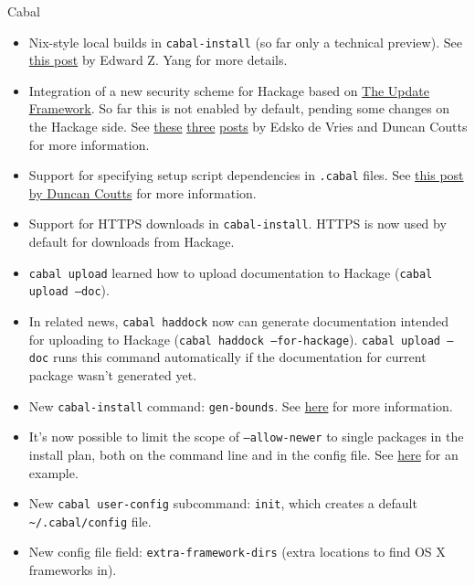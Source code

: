 \documentclass[DIV16,twocolumn,10pt]{scrreprt}
\begin{document}
\begin{hcarentry}{Cabal}
\begin{itemize}
\item Nix-style local builds in \texttt{cabal-install} (so far only a technical
  preview). See
  \href{http://blog.ezyang.com/2016/05/announcing-cabal-new-build-nix-style-local-builds/}{this
    post} by Edward Z. Yang for more details.
\item Integration of a new security scheme for Hackage based on
  \href{https://theupdateframework.github.io/}{The Update Framework}. So far
  this is not enabled by default, pending some changes on the Hackage side. See
  \href{http://www.well-typed.com/blog/2015/08/hackage-security-beta/}{these}
  \href{http://www.well-typed.com/blog/2015/07/hackage-security-alpha/}{three}
  \href{http://www.well-typed.com/blog/2015/04/improving-hackage-security/}{posts}
  by Edsko de Vries and Duncan Coutts for more information.
\item Support for specifying setup script dependencies in \texttt{.cabal}
  files. See
  \href{http://www.well-typed.com/blog/2015/07/cabal-setup-deps/}{this post by
    Duncan Coutts} for more information.
\item Support for HTTPS downloads in \texttt{cabal-install}. HTTPS is now used
  by default for downloads from Hackage.
\item \texttt{cabal upload} learned how to upload documentation to Hackage
  (\texttt{cabal upload --doc}).
\item In related news, \texttt{cabal haddock} now can generate documentation
  intended for uploading to Hackage (\texttt{cabal haddock
    --for-hackage}). \texttt{cabal upload --doc} runs this command automatically
  if the documentation for current package wasn't generated yet.
\item New \texttt{cabal-install} command: \texttt{gen-bounds}. See
  \href{http://softwaresimply.blogspot.se/2015/08/cabal-gen-bounds-easy-generation-of.html}{here}
  for more information.
\item It's now possible to limit the scope of \texttt{--allow-newer} to single
  packages in the install plan, both on the command line and in the config
  file. See \href{https://github.com/haskell/cabal/issues/2756}{here} for an
  example.
\item New \texttt{cabal user-config} subcommand: \texttt{init}, which creates a
  default \texttt{\textasciitilde{}/.cabal/config} file.
\item New config file field: \texttt{extra-framework-dirs} (extra locations to
  find OS X frameworks in).

\end{itemize}
\end{hcarentry}
\end{document}

